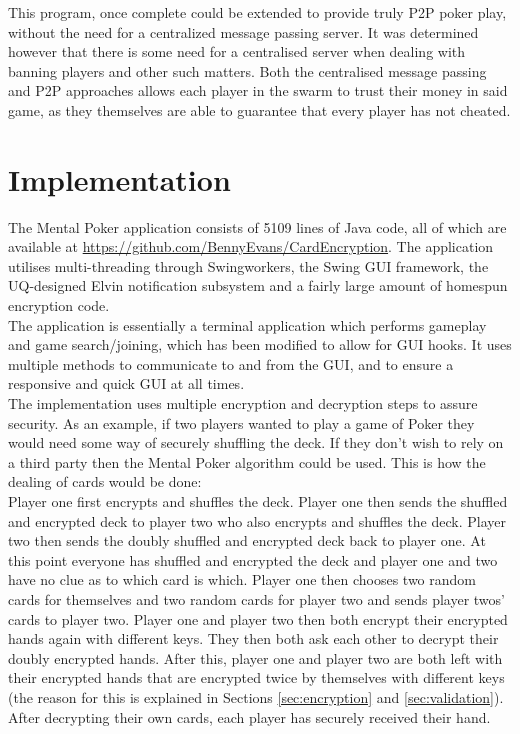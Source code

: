 \documentclass[11pt, oneside]{article}   	%
\begin{document}
This program, once complete could be extended to provide truly P2P poker play, without the need for a centralized message passing server. It was determined however that there is some need for a centralised server when dealing with banning players and other such matters. Both the centralised message passing and P2P approaches allows each player in the swarm to trust their money in said game, as they themselves are able to guarantee that every player has not cheated.

\section{Implementation}

The Mental Poker application consists of 5109 lines of Java code, all of which are available at \url{https://github.com/BennyEvans/CardEncryption}. The application utilises multi-threading through Swingworkers, the Swing GUI framework, the UQ-designed Elvin notification subsystem and a fairly large amount of homespun encryption code.\\ 

The application is essentially a terminal application which performs gameplay and game search/joining, which has been modified to allow for GUI hooks. It uses multiple methods to communicate to and from the GUI, and to ensure a responsive and quick GUI at all times.\\

The implementation uses multiple encryption and decryption steps to assure security. As an example, if two players wanted to play a game of Poker they would need some way of securely shuffling the deck. If they don't wish to rely on a third party then the Mental Poker algorithm could be used. This is how the dealing of cards would be done:\\

Player one first encrypts and shuffles the deck. Player one then sends the shuffled and encrypted deck to player two who also encrypts and shuffles the deck. Player two then sends the doubly shuffled and encrypted deck back to player one. At this point everyone has shuffled and encrypted the deck and player one and two have no clue as to which card is which. Player one then chooses two random cards for themselves and two random cards for player two and sends player twos’ cards  to player two. Player one and player two then both encrypt their encrypted hands again with different keys. They then both ask each other to decrypt their doubly encrypted hands. After this, player one and player two are both left with their encrypted hands that are encrypted twice by themselves with different keys (the reason for this is explained in Sections \ref{sec:encryption} and \ref{sec:validation}). After decrypting their own cards, each player has securely received their hand.
\end{document}
